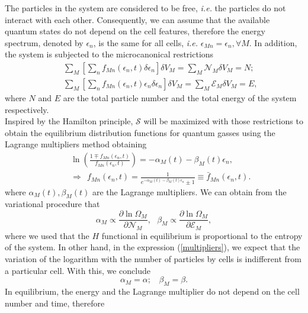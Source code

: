 \documentclass{article}
\newcommand{\de}{\delta}
\newcommand{\Ss}{\mathcal{S}}
\begin{document}
The particles in the system are considered to be free, \textit{i.e.} the particles do not interact with each other.
Consequently, we can assume that the available quantum states do not depend on the cell features,
therefore the energy spectrum, denoted by $\epsilon_n$, is the same for all cells, \textit{i.e.} $\epsilon_{Mn} = \epsilon_n, \forall M$. In addition, the system is subjected to the microcanonical restrictions
\begin{eqnarray}
    &&\sum_{M} \left[ \sum_{n}f_{Mn}(\epsilon_{n} ,t)\de \epsilon_n\right] \de V_M=\sum_{M} {\mathcal{N}}_{M} \de V_M=N; \nonumber \\
    &&\sum_{M}\left[ \sum_{n}f_{Mn}(\epsilon_{n},t)\epsilon_{n}\delta \epsilon_n\right] \de V_M=\sum_M {\mathcal{E}}_M \delta V_M=E, \label{restriccions1}
\end{eqnarray}
where $N$ and $E$ are the total particle number and the total energy of the system respectively.\\ 
Inspired by the Hamilton principle, $\Ss$ will be maximized with those restrictions to obtain the equilibrium distribution functions for quantum gasses using the Lagrange multipliers method obtaining
\begin{eqnarray}
&&\ln \left(\frac{1\mp f_{Mn}(\epsilon_{n},t)}{f_{Mn}(\epsilon_{n},t)} \right)=-\alpha_M(t)-\beta_M(t) \epsilon_{n}, \label{relation}\\ &&\Rightarrow \ \ f_{Mn}(\epsilon_{n},t)=\frac{1}{e^{-\alpha_M(t)-\beta_M(t) \epsilon_{n}}\pm 1} \equiv \bar{f}_{Mn}(\epsilon_{n},t) \label{distributionequilibrium}.
\end{eqnarray}
where $\alpha_M(t), \beta_M(t)$ are the Lagrange multipliers. We can obtain from the variational procedure that 
\begin{equation}
    \alpha_M\propto \frac{\partial \ln \Omega_M}{\partial \mathcal{N}_M}, \ \ \ \beta_M\propto \frac{\partial \ln \Omega_M}{\partial \mathcal{E}_M},\label{multipliers}
\end{equation}
where we used that the $H$ functional in equilibrium is proportional to the entropy of the system.
In other hand, in the expression (\ref{multipliers}), we expect that the variation of the logarithm with the number of particles by cells is indifferent from a particular cell. With this, we conclude  
\begin{equation}
    \alpha_M=\alpha; \ \ \ \ \beta_M=\beta.
\end{equation}
In equilibrium, the energy and the Lagrange multiplier do not depend on the cell number and time, therefore
\end{document}
